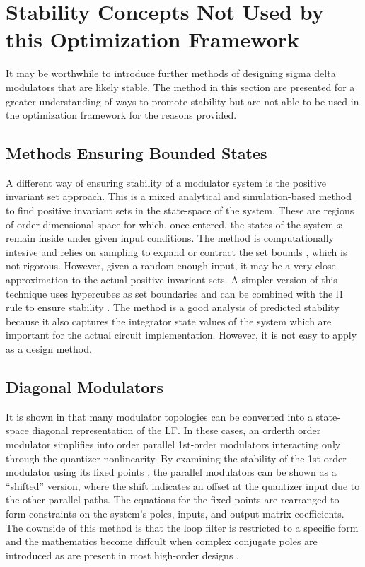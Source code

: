 \section{Stability Concepts Not Used by this Optimization Framework}
\label{sec:stab-notused}

It may be worthwhile to introduce further methods of designing sigma delta modulators that are likely stable. The method in this section are presented for a greater understanding of ways to promote stability but are not able to be used in the optimization framework for the reasons provided.

\subsection{Methods Ensuring Bounded States}

A different way of ensuring stability of a modulator system is the positive invariant set approach. This is a mixed analytical and simulation-based method to find positive invariant sets in the state-space of the system. These are regions of \gls{order}-dimensional space for which, once entered, the states of the system $x$ remain inside under given input conditions. The method is computationally intesive and relies on sampling to expand or contract the set bounds \cite{Schreier1997}, which is not rigorous. However, given a random enough input, it may be a very close approximation to the actual positive invariant sets. A simpler version of this technique uses hypercubes as set boundaries and can be combined with the \gls{l1} rule to ensure stability \cite{Yagyu2004a}. The method is a good analysis of predicted stability because it also captures the integrator state values of the system which are important for the actual circuit implementation. However, it is not easy to apply as a design method.

\subsection{Diagonal Modulators}

It is shown in \cite{Steiner1997} that many modulator topologies can be converted into a state-space diagonal representation of the \gls{LF}. In these cases, an \gls{order}th order modulator simplifies into \gls{order} parallel 1st-order modulators interacting only through the quantizer nonlinearity. By examining the stability of the 1st-order modulator using its fixed points \cite{Steiner1996}, the parallel modulators can be shown as a ``shifted'' version, where the shift indicates an offset at the quantizer input due to the other parallel paths. The equations for the fixed points are rearranged to form constraints on the system's poles, inputs, and output matrix coefficients. The downside of this method is that the loop filter is restricted to a specific form and the mathematics become diffcult when complex conjugate poles are introduced as are present in most high-order designs \cite{Mladenov2013}.

